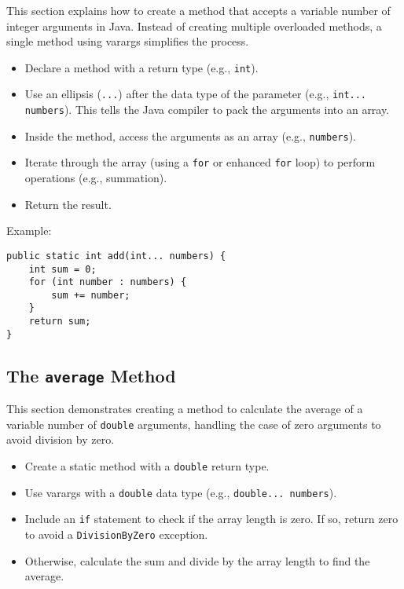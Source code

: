 \documentclass{article}
\begin{document}
This section explains how to create a method that accepts a variable number of integer arguments in Java.  Instead of creating multiple overloaded methods, a single method using varargs simplifies the process.

\begin{itemize}
    \item Declare a method with a return type (e.g., \texttt{int}).
    \item Use an ellipsis (\texttt{...}) after the data type of the parameter (e.g., \texttt{int... numbers}).  This tells the Java compiler to pack the arguments into an array.
    \item Inside the method, access the arguments as an array (e.g., \texttt{numbers}).
    \item Iterate through the array (using a \texttt{for} or enhanced \texttt{for} loop) to perform operations (e.g., summation).
    \item Return the result.
\end{itemize}

Example:

\begin{verbatim}
public static int add(int... numbers) {
    int sum = 0;
    for (int number : numbers) {
        sum += number;
    }
    return sum;
}
\end{verbatim}

\subsection{The \texttt{average} Method}

This section demonstrates creating a method to calculate the average of a variable number of \texttt{double} arguments, handling the case of zero arguments to avoid division by zero.

\begin{itemize}
    \item Create a static method with a \texttt{double} return type.
    \item Use varargs with a \texttt{double} data type (e.g., \texttt{double... numbers}).
    \item Include an \texttt{if} statement to check if the array length is zero. If so, return zero to avoid a \texttt{DivisionByZero} exception.
    \item Otherwise, calculate the sum and divide by the array length to find the average.
\end{itemize}
\end{document}
